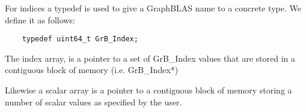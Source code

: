 For indices a typedef is used to give a GraphBLAS name to a concrete type. We define it as follows:

\begin{verbatim}
    typedef uint64_t GrB_Index;
\end {verbatim}

The index array, is a pointer to a set of GrB\_Index values that are stored in a contiguous block of memory (i.e. {\sf GrB\_Index*})

Likewise a scalar array is a pointer to a contiguous block of memory storing a number of scalar values as specified by the user.